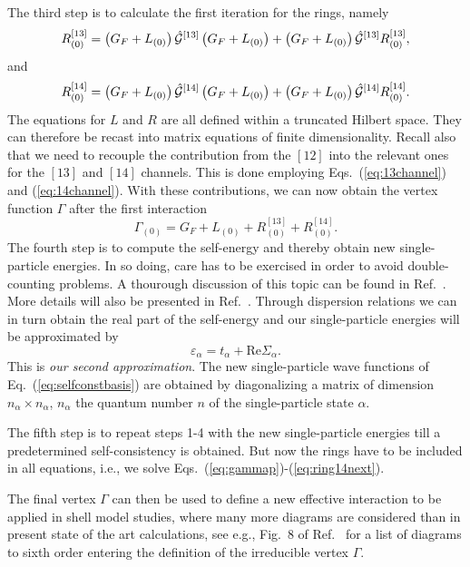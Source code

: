 The third step is to calculate the first iteration for the  
rings, namely
\begin{equation}
    R_{(0)}^{[13]}=\left(G_F+L_{(0)}\right)\hat{{\cal G}}^{[13]}
             \left(G_F+L_{(0)}\right) + 
             \left(G_F+L_{(0)}\right)\hat{{\cal G}}^{[13]}R_{(0)}^{[13]},
    \label{eq:ring13first}
\end{equation}
and
\begin{equation}
    R_{(0)}^{[14]}=\left(G_F+L_{(0)}\right)\hat{{\cal G}}^{[14]}
             \left(G_F+L_{(0)}\right) + 
             \left(G_F+L_{(0)}\right)\hat{{\cal G}}^{[14]}R_{(0)}^{[14]}.
    \label{eq:ring14first}
\end{equation}
The equations for $L$ and $R$ are all defined within a
truncated Hilbert space. They can therefore be recast into
matrix equations of finite dimensionality.
Recall also  that we need to recouple the contribution
from the $[12]$ into the relevant ones for the $[13]$ and $[14]$
channels. This is done employing Eqs.\ (\ref{eq:13channel}) and
(\ref{eq:14channel}). 
With these contributions, we can now obtain the vertex function
$\Gamma$ after the first interaction
\begin{equation}
    \Gamma_{(0)}=G_F+L_{(0)}+R_{(0)}^{[13]}+R_{(0)}^{[14]}.
\end{equation}
The fourth step is to compute the self-energy and thereby obtain
new single-particle energies. In so doing, care has to be exercised
in order to avoid double-counting problems. A thourough discussion
of this topic can be found in Ref.\ \cite{jls82}. More details
will also be presented in Ref.\ \cite{mhj99}.
Through dispersion relations \cite{rpd89} we can in turn obtain
the real part of the self-energy and our single-particle energies
will be approximated by
\begin{equation}
  \varepsilon_{\alpha}=t_{\alpha}+\mathrm{Re}\Sigma_{\alpha}.
\end{equation}
This is {\em our second approximation}.
The new single-particle wave functions of 
Eq.\ (\ref{eq:selfconstbasis}) are obtained
by diagonalizing a matrix of dimension 
$n_{\alpha}\times n_{\alpha}$, $n_{\alpha}$ the quantum
number $n$ of the single-particle state $\alpha$. 

The fifth step is to repeat steps 1-4 with the new single-particle
energies till a predetermined self-consistency is obtained. 
But now the rings have to be included in all equations, i.e.,
we solve Eqs.\ (\ref{eq:gammap})-(\ref{eq:ring14next}). 

The final vertex $\Gamma$ can then be used to define a 
new effective interaction to be applied in shell model studies,
where many more diagrams are considered than in present 
state of the art calculations, see e.g., Fig.\ 8 of Ref.\ \cite{jls82}
for a list of diagrams to sixth order entering the definition
of  the irreducible vertex $\Gamma$.

